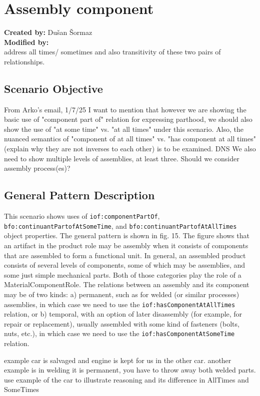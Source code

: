 \section{Assembly component}

\textbf{Created by:} Dušan Šormaz \\
\textbf{Modified by:}  \\

address all times/ sometimes and also transitivity of these two pairs of relationships.

\subsection*{Scenario Objective}
From Arko's email, 1/7/25 
I want to mention that however we are showing the basic use of "component part of" relation for expressing parthood, we should also show the use of "at some time" vs. "at all times" under this scenario. Also, the nuanced semantics of "component of at all times" vs. "has component at all times" (explain why they are not inverses to each other) is to be examined.
DNS
We also need to show multiple levels of assemblies, at least three. Should we consider assembly process(es)? 


\subsection*{General Pattern Description}

This scenario shows uses of \texttt{iof:componentPartOf}, \texttt{bfo:continuantPartofAtSomeTime}, and \texttt{bfo:continuantPartofAtAllTimes} object properties. The general pattern is shown in fig. 15. The figure shows that an artifact in the product role may be assembly when it consists of components that are assembled to form a functional unit. In general, an assembled product consists of several levels of components, some of which may be assemblies, and some just simple mechanical parts. Both of those categories play the role of a MaterialComponentRole. The relations between an assembly and its component may be of two kinds: a) permanent, such as for welded (or similar processes) assemblies, in which case we need to use the \texttt{iof:hasComponentAtAllTimes} relation, or b) temporal, with an option of later disassembly (for example, for repair or replacement), usually assembled with some  kind of fasteners (bolts, nuts, etc.), in which case we need to use the \texttt{iof:hasComponentAtSomeTime} relation.

example car is salvaged and engine is kept for us in the other car. 
another example is in welding it is permanent, you have to throw away both welded parts. 
use example of the car to illustrate reasoning and its difference in AllTimes and SomeTimes

